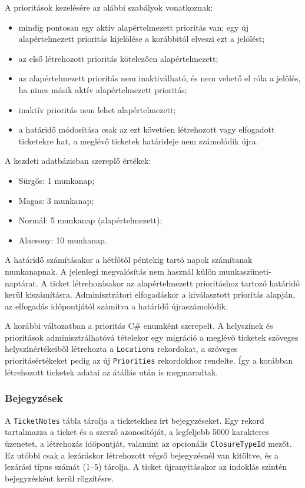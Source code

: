 \documentclass[12pt, a4paper, twoside]{article}
\begin{document}
A prioritások kezelésére az alábbi szabályok vonatkoznak:

\begin{itemize}
    \item mindig pontosan egy aktív alapértelmezett prioritás van; egy új alapértelmezett prioritás kijelölése a korábbitól elveszi ezt a jelölést;
    \item az első létrehozott prioritás kötelezően alapértelmezett;
    \item az alapértelmezett prioritás nem inaktiválható, és nem vehető el róla a jelölés, ha nincs másik aktív alapértelmezett prioritás;
    \item inaktív prioritás nem lehet alapértelmezett;
    \item a határidő módosítása csak az ezt követően létrehozott vagy elfogadott ticketekre hat, a meglévő ticketek határideje nem számolódik újra.
\end{itemize}

A kezdeti adatbázisban szereplő értékek:

\begin{itemize}
    \item Sürgős: 1 munkanap;
    \item Magas: 3 munkanap;
    \item Normál: 5 munkanap (alapértelmezett);
    \item Alacsony: 10 munkanap.
\end{itemize}

A határidő számításakor a hétfőtől péntekig tartó napok számítanak munkanapnak. A jelenlegi megvalósítás nem használ külön munkaszüneti-naptárat. A ticket létrehozásakor az alapértelmezett prioritáshoz tartozó határidő kerül kiszámításra. Adminisztrátori elfogadáskor a kiválasztott prioritás alapján, az elfogadás időpontjától számítva a határidő újraszámolódik.

A korábbi változatban a prioritás C\# enumként szerepelt. A helyszínek és prioritások adminisztrálhatóvá tételekor egy migráció a meglévő ticketek szöveges helyszínértékeiből létrehozta a \texttt{Locations} rekordokat, a szöveges prioritásértékeket pedig az új \texttt{Priorities} rekordokhoz rendelte. Így a korábban létrehozott ticketek adatai az átállás után is megmaradtak.

\subsubsection{Bejegyzések}

A \texttt{TicketNotes} tábla tárolja a ticketekhez írt bejegyzéseket. Egy rekord tartalmazza a ticket és a szerző azonosítóját, a legfeljebb 5000 karakteres üzenetet, a létrehozás időpontját, valamint az opcionális \texttt{ClosureTypeId} mezőt. Ez utóbbi csak a lezáráskor létrehozott végső bejegyzésnél van kitöltve, és a lezárási típus számát (1--5) tárolja. A ticket újranyitásakor az indoklás szintén bejegyzésként kerül rögzítésre.
\end{document}
